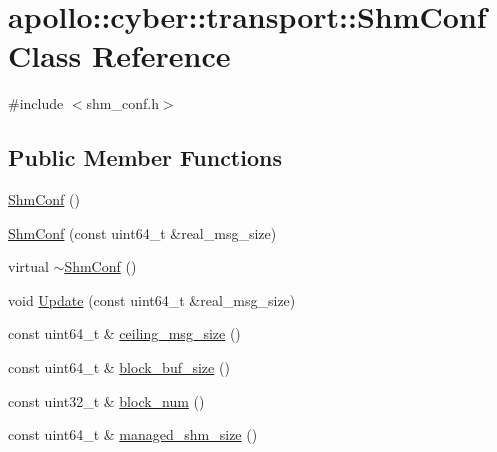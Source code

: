 \hypertarget{classapollo_1_1cyber_1_1transport_1_1ShmConf}{\section{apollo\-:\-:cyber\-:\-:transport\-:\-:Shm\-Conf Class Reference}
\label{classapollo_1_1cyber_1_1transport_1_1ShmConf}
}


{\ttfamily \#include $<$shm\-\_\-conf.\-h$>$}

\subsection*{Public Member Functions}
\begin{DoxyCompactItemize}
\item 
\hyperlink{classapollo_1_1cyber_1_1transport_1_1ShmConf_a974a61d927915cbc643c70df8fdf664a}{Shm\-Conf} ()
\item 
\hyperlink{classapollo_1_1cyber_1_1transport_1_1ShmConf_a4371522fc7caeeb92077e5a660454334}{Shm\-Conf} (const uint64\-\_\-t \&real\-\_\-msg\-\_\-size)
\item 
virtual \hyperlink{classapollo_1_1cyber_1_1transport_1_1ShmConf_ae3c15e29688bc0c9ba6f7e437670ba0b}{$\sim$\-Shm\-Conf} ()
\item 
void \hyperlink{classapollo_1_1cyber_1_1transport_1_1ShmConf_aef615d8a453e98a9e71b2ad297bdfbb6}{Update} (const uint64\-\_\-t \&real\-\_\-msg\-\_\-size)
\item 
const uint64\-\_\-t \& \hyperlink{classapollo_1_1cyber_1_1transport_1_1ShmConf_a0638b67663e292b37319c3d3d47e7530}{ceiling\-\_\-msg\-\_\-size} ()
\item 
const uint64\-\_\-t \& \hyperlink{classapollo_1_1cyber_1_1transport_1_1ShmConf_a374a75b9c60ed3941521457ca2e8e57b}{block\-\_\-buf\-\_\-size} ()
\item 
const uint32\-\_\-t \& \hyperlink{classapollo_1_1cyber_1_1transport_1_1ShmConf_acfc7a92258ba0f5a5747201242397b4e}{block\-\_\-num} ()
\item 
const uint64\-\_\-t \& \hyperlink{classapollo_1_1cyber_1_1transport_1_1ShmConf_a94e20fa38d6052edbb0af002f1fa0c75}{managed\-\_\-shm\-\_\-size} ()
\end{DoxyCompactItemize}

